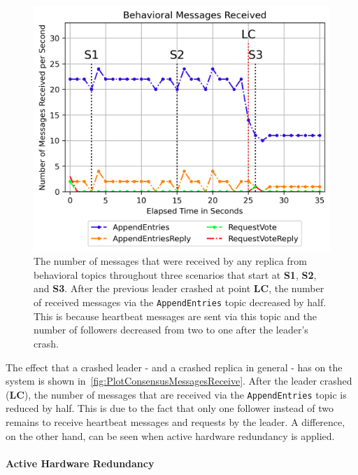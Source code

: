 \begin{figure}[!hb]
	\centering
	\includegraphics[width=0.8\linewidth]{images/plots/ConsensusMessagesReceive}
	\caption{The number of messages that were received by any replica from behavioral topics throughout three scenarios that start at \textbf{S1}, \textbf{S2}, and \textbf{S3}. After the previous leader crashed at point \textbf{LC}, the number of received messages via the \texttt{AppendEntries} topic decreased by half. This is because heartbeat messages are sent via this topic and the number of followers decreased from two to one after the leader's crash.
}
	\label{fig:PlotConsensusMessagesReceive}
\end{figure}

The effect that a crashed leader - and a crashed replica in general - has on the system is shown in~\autoref{fig:PlotConsensusMessagesReceive}.
After the leader crashed (\textbf{LC}), the number of messages that are received via the \texttt{AppendEntries} topic is reduced by half.
This is due to the fact that only one follower instead of two remains to receive heartbeat messages and requests by the leader.
A difference, on the other hand, can be seen when active hardware redundancy is applied.


\paragraph{Active Hardware Redundancy}

